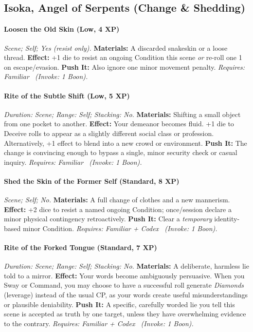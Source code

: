 \documentclass[12pt,twoside]{book}
\begin{document}
\subsection{Isoka, Angel of Serpents (Change \& Shedding)}
\paragraph{Loosen the Old Skin (Low, 4 XP)} \emph{Scene; Self; Yes (resist only).}
\textbf{Materials:} A discarded snakeskin or a loose thread.
\textbf{Effect:} +1 die to resist an ongoing Condition this scene \emph{or} re-roll one 1 on escape/evasion.
\textbf{Push It:} Also ignore one minor movement penalty.
\emph{Requires: Familiar \ (\textit{Invoke:} 1 Boon).}
\paragraph{Rite of the Subtle Shift (Low, 5 XP)} \emph{Duration: Scene; Range: Self; Stacking: No.}
\textbf{Materials:} Shifting a small object from one pocket to another.
\textbf{Effect:} Your demeanor becomes fluid. +1 die to Deceive rolls to appear as a slightly different social class or profession. Alternatively, +1 effect to blend into a new crowd or environment.
\textbf{Push It:} The change is convincing enough to bypass a single, minor security check or casual inquiry.
\emph{Requires: Familiar \ (\textit{Invoke:} 1 Boon).}
\paragraph{Shed the Skin of the Former Self (Standard, 8 XP)} \emph{Scene; Self; No.}
\textbf{Materials:} A full change of clothes and a new mannerism.
\textbf{Effect:} +2 dice to resist a named ongoing Condition; once/session declare a minor physical contingency retroactively.
\textbf{Push It:} Clear a \emph{temporary} identity-based minor Condition.
\emph{Requires: Familiar + Codex \ (\textit{Invoke:} 1 Boon).}
\paragraph{Rite of the Forked Tongue (Standard, 7 XP)} \emph{Duration: Scene; Range: Self; Stacking: No.}
\textbf{Materials:} A deliberate, harmless lie told to a mirror.
\textbf{Effect:} Your words become ambiguously persuasive. When you Sway or Command, you may choose to have a successful roll generate \emph{Diamonds} (leverage) instead of the usual CP, as your words create useful misunderstandings or plausible deniability.
\textbf{Push It:} A specific, carefully worded lie you tell this scene is accepted as truth by one target, unless they have overwhelming evidence to the contrary.
\emph{Requires: Familiar + Codex \ (\textit{Invoke:} 1 Boon).}
\end{document}

